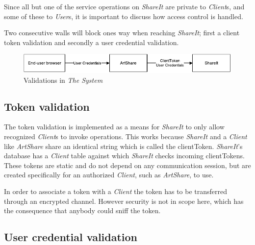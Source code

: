 \documentclass[../report.tex]{subfiles}
\begin{document}
\graphicspath{{img/}{../img/}}


Since all but one of the service operations on \textit{ShareIt} are private to \textit{Client}s, and some of these to \textit{User}s, it is important to discuss how access control is handled.

Two consecutive walls will block ones way when reaching \textit{ShareIt}; first a client token validation and secondly a user credential validation. \\


\begin{figure}[H]
\includegraphics[width=\linewidth]{./AccessControlDeployment.pdf}
\caption{Validations in \textit{The System}}
\label{fig:validations}
\end{figure}


\subsection{Token validation}
\label{sec:Token}

The token validation is implemented as a means for \textit{ShareIt} to only allow recognized \textit{Client}s to invoke operations. This works because \textit{ShareIt} and a \textit{Client} like \textit{ArtShare} share an identical string which is called the clientToken. \textit{ShareIt}'s database has a \textit{Client} table against which \textit{ShareIt} checks incoming clientTokens. These tokens are static and do not depend on any communication session, but are created specifically for an authorized \textit{Client}, such as \textit{ArtShare}, to use.

In order to associate a token with a \textit{Client} the token has to be transferred through an encrypted channel. However security is not in scope here, which has the consequence that anybody could sniff the token.





\subsection{User credential validation}
\label{sec:UserCredential}
\end{document}

